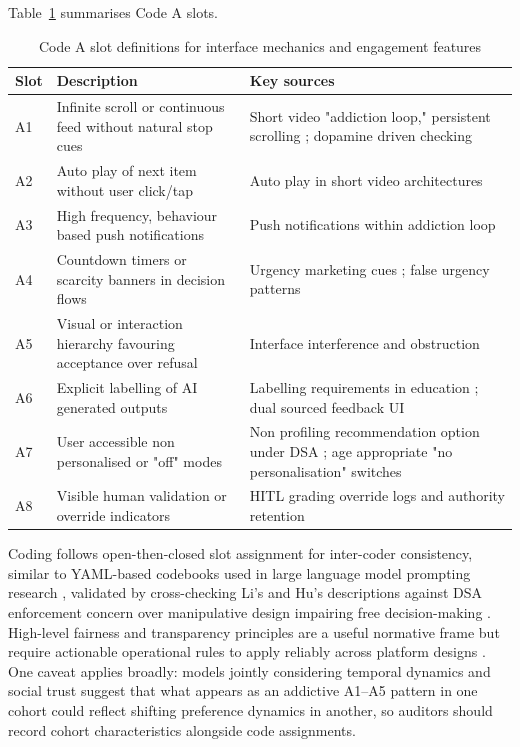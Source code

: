 \documentclass[11pt]{article}
\begin{document}
Table~\ref{tab:codeA_slots} summarises Code A slots. \begin{table}[H] \centering \caption{Code A slot definitions for interface mechanics and engagement features} \label{tab:codeA_slots} \begin{tabular}{p{1.8cm}p{5.0cm}p{5.0cm}} \hline Slot & Description & Key sources \\ \hline A1 & Infinite scroll or continuous feed without natural stop cues & Short video "addiction loop," persistent scrolling \parencites[2]{8958037}[3]{8958037}; dopamine driven checking \parencites[2]{3303310} \\ A2 & Auto play of next item without user click/tap & Auto play in short video architectures \parencites[2]{8958037} \\ A3 & High frequency, behaviour based push notifications & Push notifications within addiction loop \parencites[2]{8958037}[3]{8958037} \\ A4 & Countdown timers or scarcity banners in decision flows & Urgency marketing cues \parencites[136]{8745065}; false urgency patterns \\ A5 & Visual or interaction hierarchy favouring acceptance over refusal & Interface interference and obstruction \parencites[7]{6295677} \\ A6 & Explicit labelling of AI generated outputs & Labelling requirements in education \parencites[59.1]{2977039}; dual sourced feedback UI \parencites[20]{6805789} \\ A7 & User accessible non personalised or "off" modes & Non profiling recommendation option under DSA \parencites[7]{1456534}; age appropriate "no personalisation" switches \parencites[223]{2977039} \\ A8 & Visible human validation or override indicators & HITL grading override logs and authority retention \parencites[20]{6805789}[59.1]{2977039} \\ \hline \end{tabular} \end{table}

Coding follows open-then-closed slot assignment for inter-coder consistency, similar to YAML-based codebooks used in large language model prompting research \parencites{7286763}{8584408}, validated by cross-checking Li's and Hu's descriptions against DSA enforcement concern over manipulative design impairing free decision-making \parencites[2]{8958037}[2248]{6502223}. High-level fairness and transparency principles are a useful normative frame but require actionable operational rules to apply reliably across platform designs \parencites[3]{2168844}. One caveat applies broadly: models jointly considering temporal dynamics and social trust \parencites[2]{0335538} suggest that what appears as an addictive A1--A5 pattern in one cohort could reflect shifting preference dynamics in another, so auditors should record cohort characteristics alongside code assignments.
\end{document}
